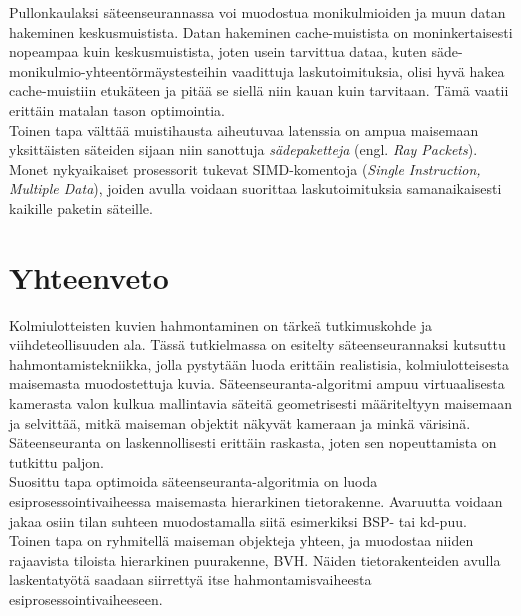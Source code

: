 \documentclass[a4paper, 12pt, titlepage]{article}
\begin{document}
Pullonkaulaksi säteenseurannassa voi muodostua monikulmioiden ja muun datan hakeminen keskusmuistista. Datan hakeminen cache-muistista on moninkertaisesti nopeampaa kuin keskusmuistista, joten usein tarvittua dataa, kuten säde-monikulmio-yhteentörmäystesteihin vaadittuja laskutoimituksia, olisi hyvä hakea cache-muistiin etukäteen ja pitää se siellä niin kauan kuin tarvitaan. Tämä vaatii erittäin matalan tason optimointia. \citep[.]{wald01}\\

Toinen tapa välttää muistihausta aiheutuvaa latenssia on ampua maisemaan yksittäisten säteiden sijaan niin sanottuja \emph{sädepaketteja} (engl. \emph{Ray Packets}). Monet nykyaikaiset prosessorit tukevat SIMD-komentoja (\emph{Single Instruction, Multiple Data}), joiden avulla voidaan suorittaa laskutoimituksia samanaikaisesti kaikille paketin säteille. \citep[.]{wald01}\\

 



\newpage
\section{Yhteenveto}

Kolmiulotteisten kuvien hahmontaminen on tärkeä tutkimuskohde ja viihdeteollisuuden ala. Tässä tutkielmassa on esitelty säteenseurannaksi kutsuttu hahmontamistekniikka, jolla pystytään luoda erittäin realistisia, kolmiulotteisesta maisemasta muodostettuja kuvia. Säteenseuranta-algoritmi ampuu virtuaalisesta kamerasta valon kulkua mallintavia säteitä geometrisesti määriteltyyn maisemaan ja selvittää, mitkä maiseman objektit näkyvät kameraan ja minkä värisinä. Säteenseuranta on laskennollisesti erittäin raskasta, joten sen nopeuttamista on tutkittu paljon.    \\

Suosittu tapa optimoida säteenseuranta-algoritmia on luoda esiprosessointivaiheessa maisemasta hierarkinen tietorakenne. Avaruutta voidaan jakaa osiin tilan suhteen muodostamalla siitä esimerkiksi BSP- tai kd-puu. Toinen tapa on ryhmitellä maiseman objekteja yhteen, ja muodostaa niiden rajaavista tiloista hierarkinen puurakenne, BVH. Näiden tietorakenteiden avulla laskentatyötä saadaan siirrettyä itse hahmontamisvaiheesta esiprosessointivaiheeseen.\\
\end{document}
